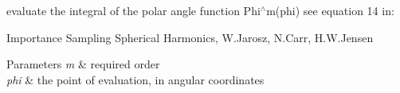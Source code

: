 evaluate the integral of the polar angle function Phi$^\wedge$m(phi) see equation 14 in\+:

Importance Sampling Spherical Harmonics, W.\+Jarosz, N.\+Carr, H.\+W.\+Jensen


\begin{DoxyParams}{Parameters}
{\em m} & required order \\
\hline
{\em phi} & the point of evaluation, in angular coordinates \\
\hline
\end{DoxyParams}
